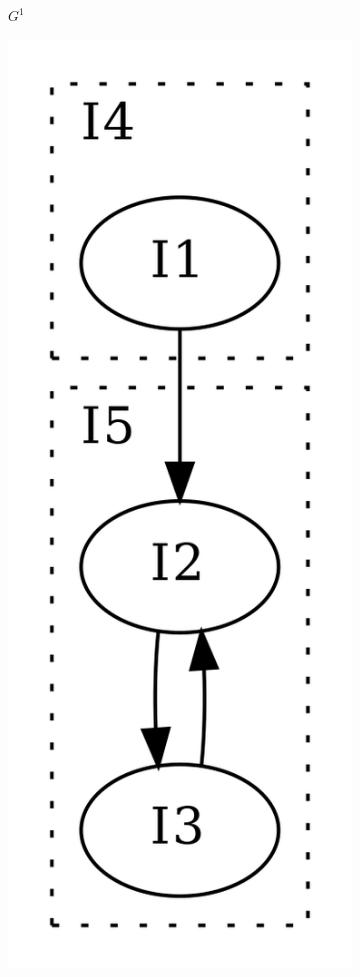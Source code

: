 \documentclass[aspectratio=1610]{beamer}
\begin{document}
\begin{frame}
\begin{figure}[htbp]
\begin{subfigure}[b]{0.18\textwidth}
			\caption{$G^1$}
		\end{subfigure}
		\qquad
		\begin{subfigure}[b]{0.10\textwidth}
			\centering
			\includegraphics[width=\textwidth]{inc/methods/interval/G_2.png}

\end{subfigure}
\end{figure}
\end{frame}
\end{document}
